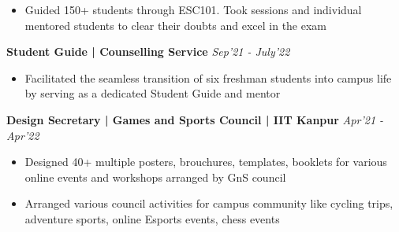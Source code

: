 \documentclass[10pt]{extarticle}
\begin{document}
{\begin{flushleft}
\begin{itemize}
    \item Guided 150+ students through ESC101. Took sessions and individual mentored students to clear their doubts and excel in the exam
\end{itemize}
\begin{tcolorbox}[center, width=20.7cm, colback=black!10]
\textbf{Student Guide | Counselling Service}  \hfill\hfill\textcolor{black!80}{\small \textit{Sep'21 - July'22}}
\end{tcolorbox}
\vspace{-10pt}
\begin{itemize}
\vspace{2.0mm}
    \item Facilitated the seamless transition of six freshman students into campus life by serving as a dedicated Student Guide and mentor
\end{itemize}
\begin{tcolorbox}[center, width=20.7cm, colback=black!10]
\textbf{Design Secretary | Games and Sports Council | IIT Kanpur}  \hfill\hfill\textcolor{black!80}{\small \textit{Apr'21 - Apr'22}}
\end{tcolorbox}
\vspace{-10pt}
\begin{itemize}
\vspace{2.0mm}
    \item Designed 40+ multiple posters, brouchures, templates, booklets for various online events and workshops arranged by GnS council
    \item Arranged various council activities for campus community like cycling trips, adventure sports, online Esports events, chess events 
\end{itemize}





\end{flushleft}}
\end{document}
